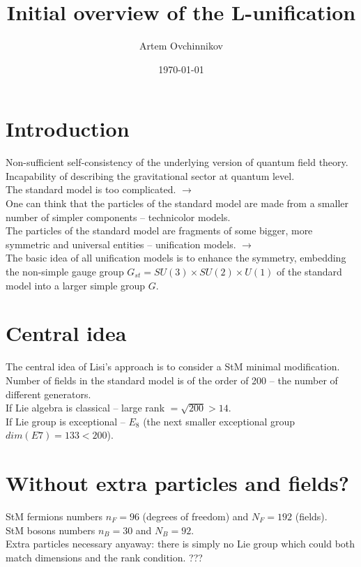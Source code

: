 \documentclass{article}
\title{Initial overview of the L-unification}
\author{Artem Ovchinnikov}
\date{\today}
\begin{document}
\maketitle

\section{Introduction}
Non-sufficient self-consistency of the underlying version of quantum field theory. \\
Incapability of describing the gravitational sector at quantum level. \\
The standard model is too complicated. $\xrightarrow{}$ \\
One can think that the particles of the standard model are made from a smaller number of simpler components – technicolor models. \\
The particles of the standard model are fragments of some bigger, more symmetric and universal entities – unification models. $\xrightarrow{}$ \\
The basic idea of all unification models is to enhance the symmetry, embedding the non-simple gauge group $ G_{st} = SU (3) \times SU (2) \times U (1) $ of the standard model into a larger simple group $G$.

\section{Central idea}
The central idea of Lisi’s approach is to consider a StM minimal modification. \\
Number of fields in the standard model is of the order of 200 -- the number of different generators. \\
If Lie algebra is classical -- large rank $= \sqrt {200} > 14$. \\
If Lie group is exceptional -- $E_8$ (the next smaller exceptional group $dim(E7) = 133 < 200$). \\

\section{Without extra particles and fields?}
StM fermions numbers $n_F = 96$ (degrees of freedom) and $N_F = 192$ (fields). \\
StM bosons numbers $n_B = 30$ and $N_B = 92$. \\
Extra particles necessary anyaway: there is simply no Lie group which could both match dimensions and the rank condition. ???
\end{document}
